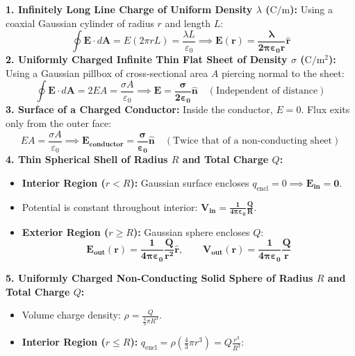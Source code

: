 \documentclass[10pt,twoside,openright]{book}
\begin{document}
\begin{formulabox}
\textbf{1. Infinitely Long Line Charge of Uniform Density $\lambda$ ($\mathrm{C/m}$):}
Using a coaxial Gaussian cylinder of radius $r$ and length $L$:
\begin{equation}
  \oint \mathbf{E}\cdot d\mathbf{A} = E(2\pi r L) = \frac{\lambda L}{\varepsilon_0} \implies \mathbf{E(r) = \frac{\lambda}{2\pi\varepsilon_0 r}\hat{\mathbf{r}}}
\end{equation}
\textbf{2. Uniformly Charged Infinite Thin Flat Sheet of Density $\sigma$ ($\mathrm{C/m^2}$):}
Using a Gaussian pillbox of cross-sectional area $A$ piercing normal to the sheet:
\begin{equation}
  \oint \mathbf{E}\cdot d\mathbf{A} = 2 E A = \frac{\sigma A}{\varepsilon_0} \implies \mathbf{E = \frac{\sigma}{2\varepsilon_0}\hat{\mathbf{n}}} \quad (\text{Independent of distance})
\end{equation}
\textbf{3. Surface of a Charged Conductor:}
Inside the conductor, $E=0$. Flux exits only from the outer face:
\begin{equation}
  E A = \frac{\sigma A}{\varepsilon_0} \implies \mathbf{E_{\text{conductor}} = \frac{\sigma}{\varepsilon_0}\hat{\mathbf{n}}} \quad (\text{Twice that of a non-conducting sheet})
\end{equation}
\textbf{4. Thin Spherical Shell of Radius $R$ and Total Charge $Q$:}
\begin{itemize}
  \item \textbf{Interior Region ($r < R$):} Gaussian surface encloses $q_{\text{encl}} = 0 \implies \mathbf{E_{\text{in}} = 0}$.
  \item Potential is constant throughout interior: $\mathbf{V_{\text{in}} = \frac{1}{4\pi\varepsilon_0}\frac{Q}{R}}$.
  \item \textbf{Exterior Region ($r \ge R$):} Gaussian sphere encloses $Q$:
  \begin{equation*}
    \mathbf{E_{\text{out}}(r) = \frac{1}{4\pi\varepsilon_0}\frac{Q}{r^2}\hat{\mathbf{r}}}, \qquad \mathbf{V_{\text{out}}(r) = \frac{1}{4\pi\varepsilon_0}\frac{Q}{r}}
  \end{equation*}
\end{itemize}
\textbf{5. Uniformly Charged Non-Conducting Solid Sphere of Radius $R$ and Total Charge $Q$:}
\begin{itemize}
  \item Volume charge density: $\rho = \frac{Q}{\frac{4}{3}\pi R^3}$.
  \item \textbf{Interior Region ($r \le R$):} $q_{\text{encl}} = \rho \left(\frac{4}{3}\pi r^3\right) = Q \frac{r^3}{R^3}$:

\end{itemize}
\end{formulabox}
\end{document}

